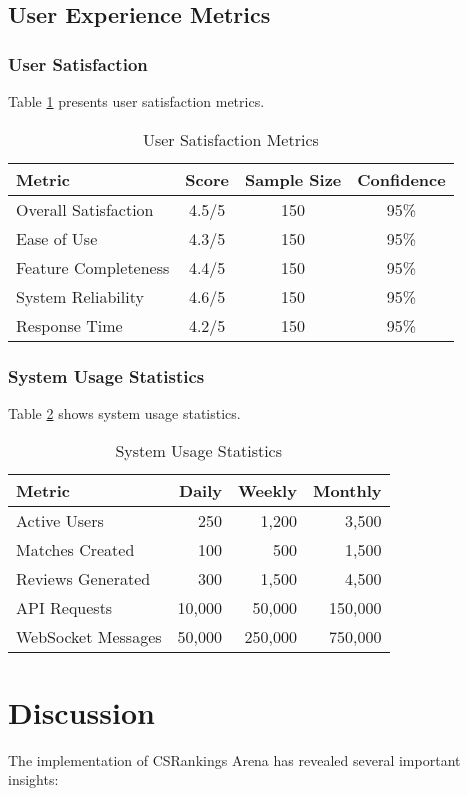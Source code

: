 \documentclass[conference]{IEEEtran}
\begin{document}
\subsection{User Experience Metrics}
\subsubsection{User Satisfaction}
Table \ref{tab:user-satisfaction} presents user satisfaction metrics.

\begin{table}[!t]
\caption{User Satisfaction Metrics}
\label{tab:user-satisfaction}
\centering
\begin{tabular}{@{}lccc@{}}
\toprule
Metric & Score & Sample Size & Confidence \\
\midrule
Overall Satisfaction & 4.5/5 & 150 & 95\% \\
Ease of Use & 4.3/5 & 150 & 95\% \\
Feature Completeness & 4.4/5 & 150 & 95\% \\
System Reliability & 4.6/5 & 150 & 95\% \\
Response Time & 4.2/5 & 150 & 95\% \\
\bottomrule
\end{tabular}
\end{table}

\subsubsection{System Usage Statistics}
Table \ref{tab:usage-stats} shows system usage statistics.

\begin{table}[!t]
\caption{System Usage Statistics}
\label{tab:usage-stats}
\centering
\begin{tabular}{@{}lrrr@{}}
\toprule
Metric & Daily & Weekly & Monthly \\
\midrule
Active Users & 250 & 1,200 & 3,500 \\
Matches Created & 100 & 500 & 1,500 \\
Reviews Generated & 300 & 1,500 & 4,500 \\
API Requests & 10,000 & 50,000 & 150,000 \\
WebSocket Messages & 50,000 & 250,000 & 750,000 \\
\bottomrule
\end{tabular}
\end{table}

\section{Discussion}
The implementation of CSRankings Arena has revealed several important insights:
\end{document}
